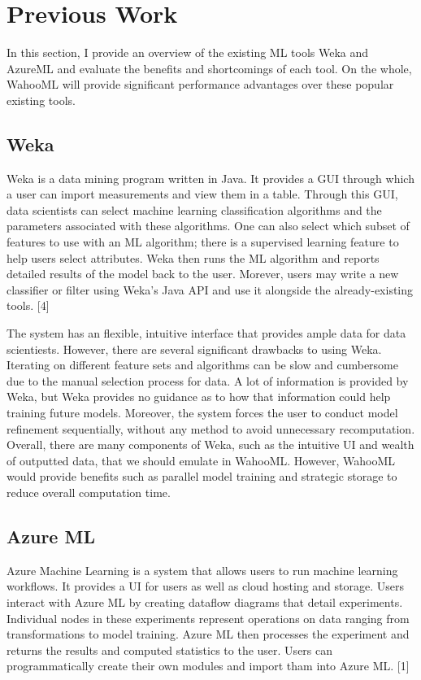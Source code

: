 \documentclass[../proposal.tex]{subfiles}
\begin{document}
\section{Previous Work}

In this section, I provide an overview of the existing ML tools Weka and
AzureML and evaluate the benefits and shortcomings of each tool. On the whole,
WahooML will provide significant performance advantages over these popular
existing tools.

\subsection{Weka}
Weka is a data mining program written in Java. It provides a GUI through which
a user can import measurements and view them in a table.  Through this GUI,
data scientists can select machine learning classification algorithms and the
parameters associated with these algorithms. One can also select which subset
of features to use with an ML algorithm; there is a supervised learning feature
to help users select attributes. Weka then runs the ML algorithm and reports
detailed results of the model back to the user. Morever, users may write a new
classifier or filter using Weka's Java API and use it alongside the
already-existing tools. [4]

The system has an flexible, intuitive interface that provides ample data for
data scientiests. However, there are several significant drawbacks to using
Weka. Iterating on different feature sets and algorithms can be slow and
cumbersome due to the manual selection process for data. A lot of information
is provided by Weka, but Weka provides no guidance as to how that information
could help training future models. Moreover, the system forces the user to
conduct model refinement sequentially, without any method to avoid unnecessary
recomputation. Overall, there are many components of Weka, such as the
intuitive UI and wealth of outputted data, that we should emulate in WahooML.
However, WahooML would provide benefits such as parallel model training and
strategic storage to reduce overall computation time.

\subsection{Azure ML}
Azure Machine Learning is a system that allows users to run machine learning
workflows. It provides a UI for users as well as cloud hosting and storage.
Users interact with Azure ML by creating dataflow diagrams that detail
experiments. Individual nodes in these experiments represent operations on data
ranging from transformations to model training. Azure ML then processes the
experiment and returns the results and computed statistics to the user. Users
can programmatically create their own modules and import tham into Azure ML. [1]
\end{document}
